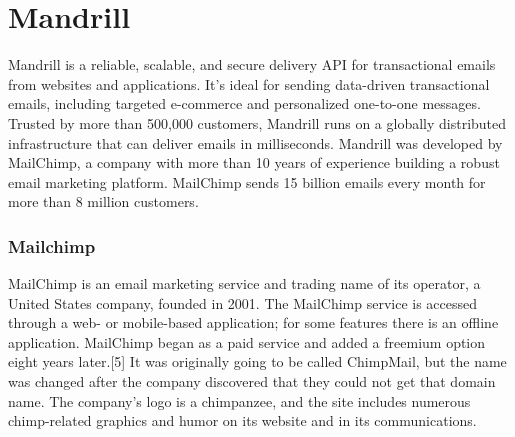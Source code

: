 \section{Mandrill}
\label{sec:USR_mandrill}


Mandrill is a reliable, scalable, and secure delivery API for transactional emails from websites and applications. It's ideal for sending data-driven transactional emails, including targeted e-commerce and personalized one-to-one messages.
Trusted by more than 500,000 customers, Mandrill runs on a globally distributed infrastructure that can deliver emails in milliseconds.
Mandrill was developed by MailChimp, a company with more than 10 years of experience building a robust email marketing platform. MailChimp sends 15 billion emails every month for more than 8 million customers.


\subsubsection{Mailchimp}
\label{subsubsec:USR_mandrill_mailchimp}
MailChimp is an email marketing service and trading name of its operator, a United States company, founded in 2001.
The MailChimp service is accessed through a web- or mobile-based application; for some features there is an offline application.
MailChimp began as a paid service and added a freemium option eight years later.[5] It was originally going to be called ChimpMail, but the name was changed after the company discovered that they could not get that domain name.
The company's logo is a chimpanzee, and the site includes numerous chimp-related graphics and humor on its website and in its communications.